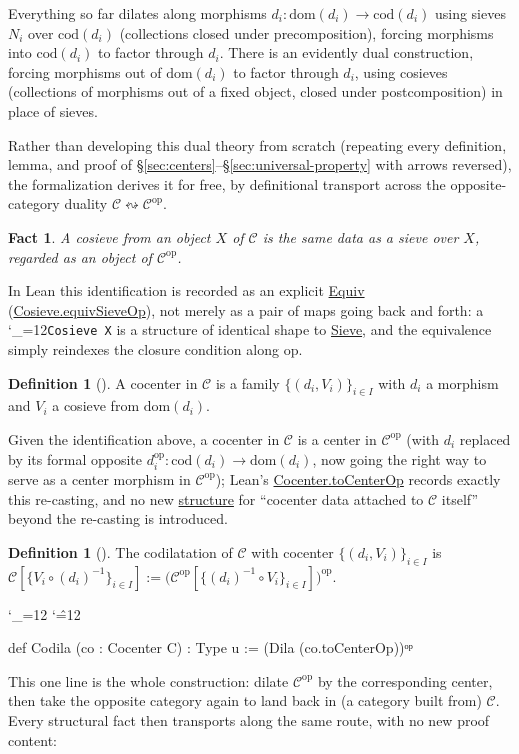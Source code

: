 \documentclass[11pt]{amsart}
\newcommand{\lc}[1]{\url{#1}}
\newcommand{\lcode}{\begingroup\catcode`\_=12\relax\lcodeInner}
\newcommand{\lcodeInner}[1]{\texttt{#1}\endgroup}
\newenvironment{leancode}{%
  \begingroup
  \catcode`\_=12\relax
  \catcode`\^=12\relax
  \small\ttfamily\raggedright\baselineskip=1.15\baselineskip
  \par\smallskip\noindent
}{%
  \par\smallskip
  \endgroup
}
\theoremstyle{plain}
\newtheorem{fact}[theorem]{Fact}
\theoremstyle{definition}
\newtheorem{definition}[theorem]{Definition}
\theoremstyle{remark}
\newcommand{\calC}{\mathcal C}
\newcommand{\op}{\ensuremath{\mathrm{op}}}
\newcommand{\dom}{\mathrm{dom}}
\newcommand{\cod}{\mathrm{cod}}
\begin{document}
Everything so far dilates along morphisms $d_i : \dom(d_i) \to \cod(d_i)$ using
sieves $N_i$ over $\cod(d_i)$ (collections closed under precomposition), forcing
morphisms into $\cod(d_i)$ to factor through $d_i$. There is an evidently dual
construction, forcing morphisms out of $\dom(d_i)$ to factor through $d_i$, using
cosieves (collections of morphisms out of a fixed object, closed under
postcomposition) in place of sieves.

Rather than developing this dual theory from scratch (repeating every definition,
lemma, and proof of \S\ref{sec:centers}--\S\ref{sec:universal-property} with arrows reversed),
the formalization derives it for free, by definitional transport across the
opposite-category duality $\calC \leftrightsquigarrow \calC^{\op}$.

\begin{fact}
A cosieve from an object $X$ of $\calC$ is the same data as a sieve over $X$, regarded as an
object of $\calC^{\op}$.
\end{fact}

In Lean this identification is recorded as an explicit \lc{Equiv} (\lc{Cosieve.equivSieveOp}),
not merely as a pair of maps going back and forth: a \lcode{Cosieve X} is a structure of
identical shape to \lc{Sieve}, and the equivalence simply reindexes the closure condition
along $\op$.

\begin{definition}[{\citep[Definition~4.1]{Mayeux}}]
A cocenter in $\calC$ is a family $\{(d_i,V_i)\}_{i\in I}$ with $d_i$ a morphism and
$V_i$ a cosieve from $\dom(d_i)$.
\end{definition}
Given the identification above, a cocenter in $\calC$ is a center in $\calC^{\op}$
(with $d_i$ replaced by its formal opposite $d_i^{\op} : \cod(d_i) \to \dom(d_i)$, now going
the right way to serve as a center morphism in $\calC^{\op}$); Lean's
\lc{Cocenter.toCenterOp} records exactly this re-casting, and no new \lc{structure} for
``cocenter data attached to $\calC$ itself'' beyond the re-casting is introduced.

\begin{definition}[{\citep[Definition~4.3]{Mayeux}}]
The codilatation of $\calC$ with cocenter $\{(d_i,V_i)\}_{i\in I}$ is
$\calC[\{V_i\circ(d_i)^{-1}\}_{i\in I}] := \big(\calC^{\op}[\{(d_i)^{-1}\circ
V_i\}_{i\in I}]\big)^{\op}$.
\end{definition}

\begin{leancode}
def Codila (co : Cocenter C) : Type u := (Dila (co.toCenterOp))ᵒᵖ \\
\end{leancode}
This one line is the whole construction: dilate $\calC^{\op}$ by the corresponding
center, then take the opposite category again to land back in (a category built from)
$\calC$. Every structural fact then transports along the same route, with no new proof
content:
\end{document}
